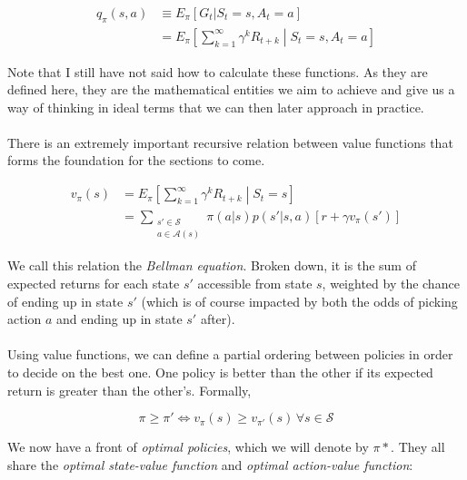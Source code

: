 \begin{equation}
  \begin{split}
    q_\pi(s,a) &\equiv E_\pi[G_t | S_t = s, A_t = a] \\
    &= E_\pi \left[ \sum^\infty_{k=1}\gamma^kR_{t+k} \middle| S_t = s, A_t = a \right]
  \end{split}
\end{equation}

Note that I still have not said how to calculate these functions.
As they are defined here, they are the mathematical entities we aim to achieve
and give us a way of thinking in ideal terms
that we can then later approach in practice.

\paragraph{}
There is an extremely important recursive relation
between value functions that forms the foundation for the sections to come.

\begin{equation}
  \begin{split}
    v_\pi(s)
    &= E_\pi \left[ \sum^\infty_{k=1}\gamma^kR_{t+k} \middle| S_t = s \right] \\
    &= \sum_{\substack{s' \in \mathcal{S} \\ a \in \mathcal{A}(s)}}
    \pi(a|s) p(s'|s, a) \left [ r + \gamma v_\pi(s') \right ]
  \end{split}
\end{equation}

We call this relation the \textit{Bellman equation}.
Broken down, it is the sum of expected returns for each state $s'$
accessible from state $s$,
weighted by the chance of ending up in state $s'$
(which is of course impacted by both the odds of picking action $a$
and ending up in state $s'$ after).

\paragraph{}
Using value functions,
we can define a partial ordering between policies
in order to decide on the best one.
One policy is better than the other
if its expected return is greater than the other's.
Formally,

$$
\pi \geq \pi' \iff v_\pi(s) \geq v_{\pi'}(s) \, \forall s \in \mathcal{S}
$$

We now have a front of \textit{optimal policies},
which we will denote by $\pi*$.
They all share the \textit{ optimal state-value function }
and \textit{optimal action-value function}:

